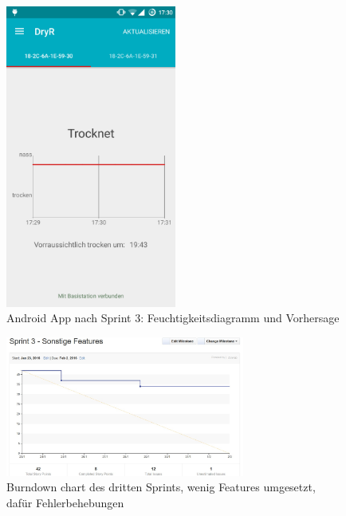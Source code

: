 \begin{figure}[htb] 
	\centerline{\includegraphics[width=0.5\textwidth]{laundry_status_diagram_forecast.png}}
	\caption{Android App nach Sprint 3: Feuchtigkeitsdiagramm und Vorhersage}
	\label{screenshot_sprint_3_laundry_status}
\end{figure}
\begin{figure}[htb] 
	\centerline{\includegraphics[width=0.7\textwidth]{burndown_sprint3.jpg}}
	\caption{Burndown chart des dritten Sprints, wenig Features umgesetzt, dafür Fehlerbehebungen}
	\label{screenshot_sprint_3_burndown}
\end{figure}

